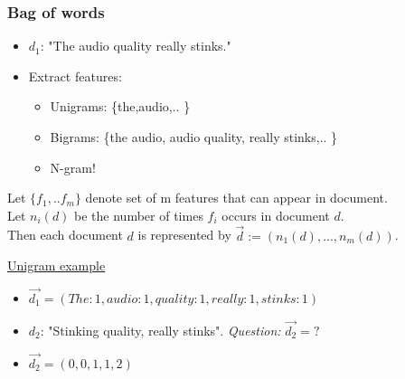 \documentclass{beamer}
\begin{document}
\begin{frame}
\frametitle{Bag of words}

\begin{itemize}
	\item $d_1$: "The audio quality really stinks."
	\pause
	\item Extract features:
	\begin{itemize}
		\item Unigrams: \{the,audio,..  \}
		\item Bigrams: \{the audio, audio quality, really stinks,.. \}
		\item N-gram!	
	\end{itemize}
\end{itemize}

\pause
\begin{Definition}
	Let $\{f_1,..f_m\}$ denote set of m features that can appear in document. \\
	Let $n_i(d)$ be the number of times $f_i$ occurs in document $d$. \\ 
	Then each document $d$ is represented by $\overrightarrow{d}:=(n_1(d),...,n_m(d))$.
\end{Definition}

\pause
\underline{Unigram example}
\begin{itemize}
	\item $\overrightarrow{d_1} = (The: 1, audio: 1, quality: 1, really:1, stinks:1)$
	\pause
	\item $d_2$: "Stinking quality, really stinks". \emph{Question:} $\overrightarrow{d_2} = ?$
	\pause
	\item $\overrightarrow{d_2} = (0, 0, 1, 1,2)$
\end{itemize}

\end{frame}
\end{document}
